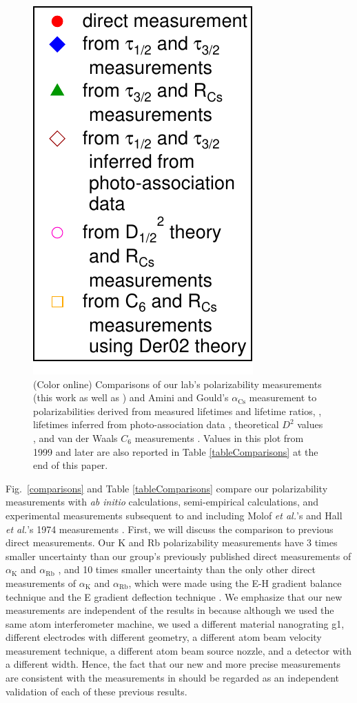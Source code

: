 \documentclass[twocolumn,pra,showpacs,superscriptaddress,longbibliography]{revtex4-1}   %
\newcommand{\figref}[1]{Fig.~\ref{#1}}
\newcommand{\ak}{\alpha_{\textrm{K}}}
\newcommand{\arb}{\alpha_{\textrm{Rb}}}
\newcommand{\acs}{\alpha_{\textrm{Cs}}}
\newcommand{\etal}{\textit{et al.}}
\begin{document}
\begin{figure}
\includegraphics[width=0.365\linewidth,keepaspectratio,valign=t]{displayMiscLegend.pdf}
\caption{\label{comparisonsMisc}(Color online) Comparisons of our lab's polarizability measurements (this work as well as \cite{Holmgren2010}) and Amini and Gould's $\acs$ measurement \cite{Amini2003} to polarizabilities derived from measured lifetimes and lifetime ratios,
\cite{Young1994,Volz2006,Wang1997,Wang1997a,Simsarian1998,Rafac1999,Falke2006a,Amiot2002,Bouloufa2007,Rafac1998}, 
lifetimes inferred from photo-association data
\cite{Gutterres2002,Gabbanini2000},
theoretical $D^2$ values
\cite{Porsev2010},
and van der Waals $C_6$ measurements
\cite{Leo2000,Chin2004,Derevianko2001}. Values in this plot from 1999 and later are also reported in Table \ref{tableComparisons} at the end of this paper.}
\end{figure}


\figref{comparisons} and Table \ref{tableComparisons} compare our polarizability measurements with \textit{ab initio} calculations, semi-empirical calculations, and experimental measurements subsequent to and including Molof \etal's and Hall \etal's 1974 measurements \cite{Molof1974a,Hall1974}.  First, we will discuss the comparison to previous direct measurements.   Our K and Rb polarizability measurements have 3 times smaller uncertainty than our group's previously published direct measurements of $\ak$ and $\arb$ \cite{Holmgren2010}, and 10 times smaller uncertainty than the only other direct measurements of $\ak$ and $\arb$, which were made using the E-H gradient balance technique \cite{Molof1974a} and the E gradient deflection technique  \cite{Hall1974}.  We emphasize that our new measurements are independent of the results in \cite{Holmgren2010} because although we used the same atom interferometer machine, we used a different material nanograting g1, different electrodes with different geometry, a different atom beam velocity measurement technique, a different atom beam source nozzle, and a detector with a different width. Hence, the fact that our new and more precise measurements are consistent with the measurements in \cite{Holmgren2010,Molof1974a,Hall1974} should be regarded as an independent validation of each of these previous results.
\end{document}
